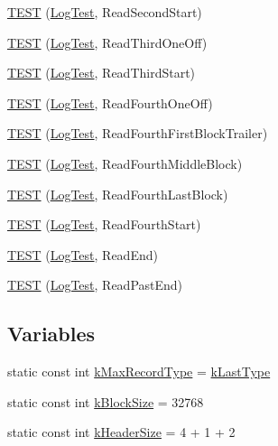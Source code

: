 \begin{DoxyCompactItemize}
\item 
\hyperlink{namespaceleveldb_1_1log_aa9e212a334431228c79a843316480db0}{T\+E\+S\+T} (\hyperlink{classleveldb_1_1log_1_1_log_test}{Log\+Test}, Read\+Second\+Start)
\item 
\hyperlink{namespaceleveldb_1_1log_af5f8505f08225382f290158f5175cca0}{T\+E\+S\+T} (\hyperlink{classleveldb_1_1log_1_1_log_test}{Log\+Test}, Read\+Third\+One\+Off)
\item 
\hyperlink{namespaceleveldb_1_1log_a87cfcd7bb0a248dc72d9856e1d00d519}{T\+E\+S\+T} (\hyperlink{classleveldb_1_1log_1_1_log_test}{Log\+Test}, Read\+Third\+Start)
\item 
\hyperlink{namespaceleveldb_1_1log_abbda151ff0e2439ac1dfa823a6089439}{T\+E\+S\+T} (\hyperlink{classleveldb_1_1log_1_1_log_test}{Log\+Test}, Read\+Fourth\+One\+Off)
\item 
\hyperlink{namespaceleveldb_1_1log_a85f6833939c09f181924774403bfbe4f}{T\+E\+S\+T} (\hyperlink{classleveldb_1_1log_1_1_log_test}{Log\+Test}, Read\+Fourth\+First\+Block\+Trailer)
\item 
\hyperlink{namespaceleveldb_1_1log_a6fb47c0abe5c036d95a4f9aeb1d62174}{T\+E\+S\+T} (\hyperlink{classleveldb_1_1log_1_1_log_test}{Log\+Test}, Read\+Fourth\+Middle\+Block)
\item 
\hyperlink{namespaceleveldb_1_1log_a9c80a844e21aec7c6fbde209e99c1ad8}{T\+E\+S\+T} (\hyperlink{classleveldb_1_1log_1_1_log_test}{Log\+Test}, Read\+Fourth\+Last\+Block)
\item 
\hyperlink{namespaceleveldb_1_1log_aa652940a4e7bff7fa21f0d1c941712d7}{T\+E\+S\+T} (\hyperlink{classleveldb_1_1log_1_1_log_test}{Log\+Test}, Read\+Fourth\+Start)
\item 
\hyperlink{namespaceleveldb_1_1log_a74e0fb6c39041d1ef2193114b0a2275b}{T\+E\+S\+T} (\hyperlink{classleveldb_1_1log_1_1_log_test}{Log\+Test}, Read\+End)
\item 
\hyperlink{namespaceleveldb_1_1log_ae1081d375c33d8b2f01d5593ecd5f4a7}{T\+E\+S\+T} (\hyperlink{classleveldb_1_1log_1_1_log_test}{Log\+Test}, Read\+Past\+End)
\end{DoxyCompactItemize}
\subsection*{Variables}
\begin{DoxyCompactItemize}
\item 
static const int \hyperlink{namespaceleveldb_1_1log_a45cb8306b6156236656172086c1394df}{k\+Max\+Record\+Type} = \hyperlink{namespaceleveldb_1_1log_a01bdc1b51beb634f14f8fbb70fbd8d2aa29f913fb4d719f97a9618bca93775dfc}{k\+Last\+Type}
\item 
static const int \hyperlink{namespaceleveldb_1_1log_a2daa4274b5fc09292a7d856072f379b2}{k\+Block\+Size} = 32768
\item 
static const int \hyperlink{namespaceleveldb_1_1log_a3771f9a7e5d0e9057d33fbfd371f7e83}{k\+Header\+Size} = 4 + 1 + 2
\end{DoxyCompactItemize}


